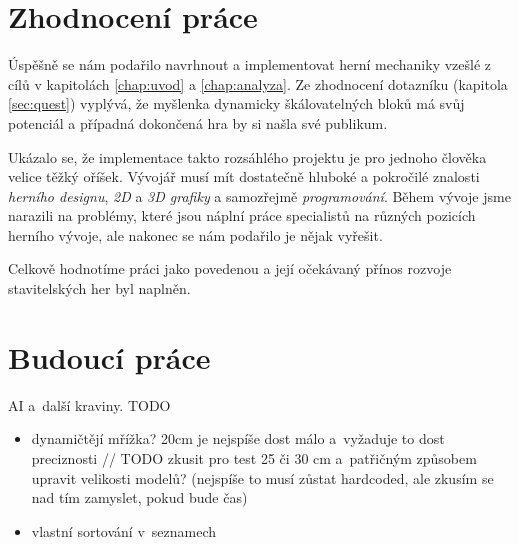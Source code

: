 \section{Zhodnocení práce}

Úspěšně se nám podařilo navrhnout a implementovat herní mechaniky vzešlé z cílů v kapitolách \ref{chap:uvod} a \ref{chap:analyza}. Ze zhodnocení dotazníku (kapitola \ref{sec:quest}) vyplývá, že myšlenka dynamicky škálovatelných bloků má svůj potenciál a případná dokončená hra by si našla své publikum.

Ukázalo se, že implementace takto rozsáhlého projektu je pro jednoho člověka velice těžký oříšek. Vývojář musí mít dostatečně hluboké a pokročilé znalosti \textit{herního designu}, \textit{2D} a \textit{3D grafiky} a samozřejmě \textit{programování}. Během vývoje jsme narazili na problémy, které jsou náplní práce specialistů na různých pozicích herního vývoje, ale nakonec se nám podařilo je nějak vyřešit.

Celkově hodnotíme práci jako povedenou a její očekávaný přínos rozvoje stavitelských her byl naplněn.





\section{Budoucí práce}

AI a~další kraviny. TODO

\begin{itemize}
	\item dynamičtějí mřížka? 20cm je nejspíše dost málo a~vyžaduje to dost preciznosti // TODO zkusit pro test 25 či 30 cm a~patřičným způsobem upravit velikosti modelů? (nejspíše to musí zůstat hardcoded, ale zkusím se nad tím zamyslet, pokud bude čas)
	\item vlastní sortování v~seznamech

\end{itemize}

